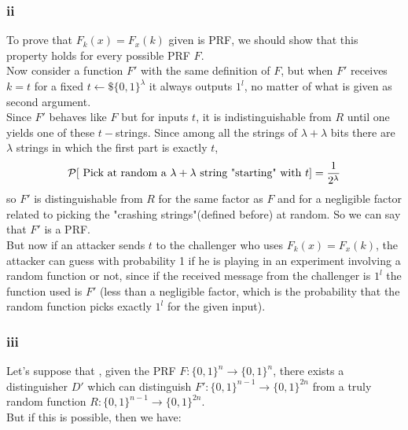 \documentclass[11pt]{article}
\newcounter{t0d0_counter}
\begin{document}
\subsubsection{ii}

To prove that $F_{k}(x)=F_{x}(k)$ given is PRF, we should show that this property holds for every possible PRF $F$.\\
Now consider a function $F'$ with the same definition of $F$, but when $F'$
receives $k=t$ for a fixed $t \leftarrow\$ \{0,1\}^{\lambda} $ it always outputs
$1^{l}$, no matter of what is given as second argument.\\

Since $F'$ behaves like $F$ but for inputs $t$, it is indistinguishable from $R$ until one yields one of these $t-$strings. Since among all the strings of $\lambda + \lambda$ bits there are $\lambda$ strings in which the first part is exactly $t$, 
\[
    \P [ \text{ Pick at random a $\lambda + \lambda$ string "starting" with $t$}
    ]= \frac{1}{2^{\lambda}}  
\]
so $F'$ is distinguishable from $R$ for the same factor as  $F$ and for a negligible factor related to picking the "crashing strings"(defined before) at random.
So we can say that $F'$ is a PRF.\\

But now if an attacker sends $t$ to the challenger who uses $F_{k}(x)=F_{x}(k)$,
the attacker can guess with probability 1 if he is playing in an experiment
involving a random function or not, since if the received message from the
challenger is $1^{l}$ the function used is $F'$ (less than a negligible factor,
which is the probability that the random function picks exactly $1^{l}$ for the
given input).
\newpage
\subsubsection{iii}
Let's suppose that , given the PRF $F:\{0,1\}^{n} \to \{0,1\}^{n}$, there
exists a distinguisher $D'$ which can distinguish $F':\{0,1\}^{n-1} \to
\{0,1\}^{2n} $ from a truly random function $R:\{0,1\}^{n-1} \to
\{0,1\}^{2n} $.\\
But if this is possible, then we have:
\end{document}
